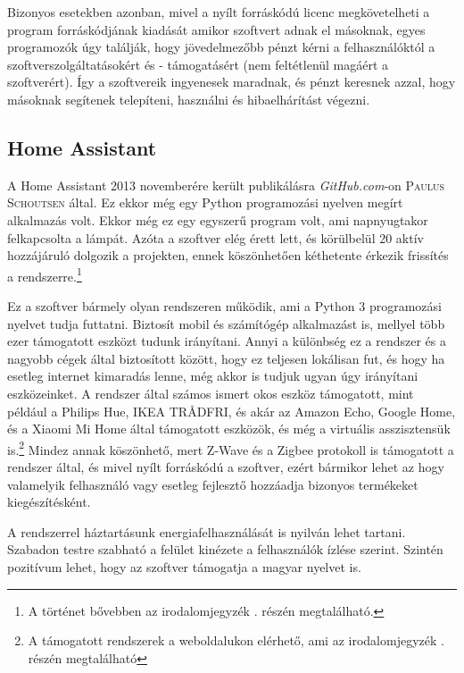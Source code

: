 \documentclass[
]{thesis-ekf}
\theoremstyle{definition}
\theoremstyle{remark}
\begin{document}
	Bizonyos esetekben azonban, mivel a nyílt forráskódú licenc megkövetelheti a program forráskódjának kiadását amikor szoftvert adnak el másoknak, egyes programozók úgy találják, hogy jövedelmezőbb pénzt kérni a felhasználóktól a szoftverszolgáltatásokért és - támogatásért (nem feltétlenül magáért a szoftverért). Így a szoftvereik ingyenesek maradnak, és pénzt keresnek azzal, hogy másoknak segítenek telepíteni, használni és hibaelhárítást végezni.
	
	\subsection*{Home Assistant}
	
	A Home Assistant 2013 novemberére került publikálásra \emph{GitHub.com}-on \textsc{Paulus Schoutsen} által. Ez ekkor még egy Python programozási nyelven megírt alkalmazás volt. Ekkor még ez egy egyszerű program volt, ami napnyugtakor felkapcsolta a lámpát. Azóta a szoftver elég érett lett, és körülbelül 20 aktív hozzájáruló dolgozik a projekten, ennek köszönhetően kéthetente érkezik frissítés a rendszerre.\footnote{\label{history-of-home-assistant}A történet bővebben az irodalomjegyzék  \cite{creation-of-home-assistant}. részén megtalálható.}
	
	Ez a szoftver bármely olyan rendszeren működik, ami a Python 3 programozási nyelvet tudja futtatni. Biztosít mobil és számítógép alkalmazást is, mellyel több ezer támogatott eszközt tudunk irányítani. Annyi a különbség ez a rendszer és a nagyobb cégek által biztosított között, hogy ez teljesen lokálisan fut, és hogy ha esetleg internet kimaradás lenne, még akkor is tudjuk ugyan úgy irányítani eszközeinket. A rendszer által számos ismert okos eszköz támogatott, mint például a Philips Hue, IKEA TRÅDFRI, és akár az Amazon Echo, Google Home, és a Xiaomi Mi Home által támogatott eszközök, és még a virtuális asszisztensük is.\footnote{A támogatott rendszerek a weboldalukon elérhető, ami az irodalomjegyzék \cite{home-assistance-itegrations}. részén megtalálható} Mindez annak köszönhető, mert Z-Wave és a Zigbee protokoll is támogatott a rendszer által, és mivel nyílt forráskódú a szoftver, ezért bármikor lehet az hogy valamelyik felhasználó vagy esetleg fejlesztő hozzáadja bizonyos termékeket kiegészítésként. 

	A rendszerrel háztartásunk energiafelhasználását is nyilván lehet tartani. Szabadon testre szabható a felület kinézete a felhasználók ízlése szerint. Szintén pozitívum lehet, hogy az szoftver támogatja a magyar nyelvet is.
	
\end{document}
